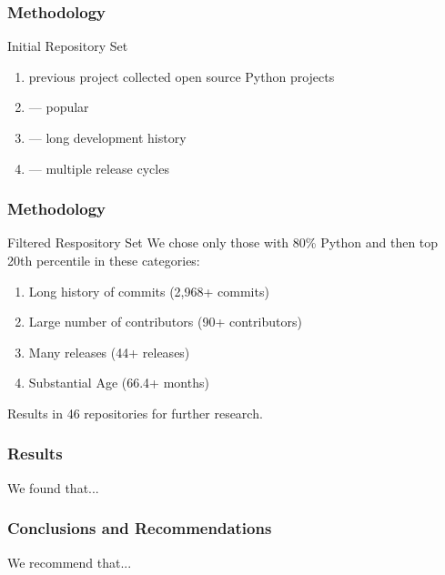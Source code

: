 \documentclass{beamer}
\begin{document}
\begin{frame}
  \frametitle{Methodology}
  Initial Repository Set
  \begin{enumerate}
    \item previous project collected open source Python projects
    \item --- popular
    \item --- long development history
    \item --- multiple release cycles
  \end{enumerate}
\end{frame}

\begin{frame}
  \frametitle{Methodology}
  Filtered Respository Set
  We chose only those with 80\% Python and then top 20th percentile in these categories:
  \begin{enumerate}
    \item Long history of commits (2,968+ commits)
    \item Large number of contributors (90+ contributors)
    \item Many releases (44+ releases)
    \item Substantial Age (66.4+ months)
  \end{enumerate}
  Results in 46 repositories for further research.
\end{frame}

\begin{frame}
  \frametitle{Results}
  We found that...
\end{frame}

\begin{frame}
  \frametitle{Conclusions and Recommendations}
  We recommend that...
\end{frame}
\end{document}
